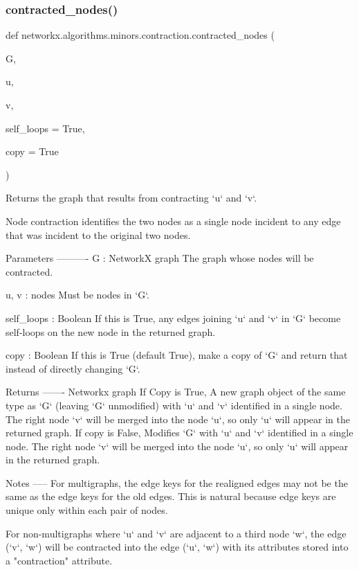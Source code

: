 \subsubsection{\texorpdfstring{contracted\+\_\+nodes()}{contracted\_nodes()}}
{\footnotesize\ttfamily def networkx.\+algorithms.\+minors.\+contraction.\+contracted\+\_\+nodes (\begin{DoxyParamCaption}\item[{}]{G,  }\item[{}]{u,  }\item[{}]{v,  }\item[{}]{self\+\_\+loops = {\ttfamily True},  }\item[{}]{copy = {\ttfamily True} }\end{DoxyParamCaption})}

\begin{DoxyVerb}Returns the graph that results from contracting `u` and `v`.

Node contraction identifies the two nodes as a single node incident to any
edge that was incident to the original two nodes.

Parameters
----------
G : NetworkX graph
    The graph whose nodes will be contracted.

u, v : nodes
    Must be nodes in `G`.

self_loops : Boolean
    If this is True, any edges joining `u` and `v` in `G` become
    self-loops on the new node in the returned graph.

copy : Boolean
    If this is True (default True), make a copy of
    `G` and return that instead of directly changing `G`.


Returns
-------
Networkx graph
    If Copy is True,
    A new graph object of the same type as `G` (leaving `G` unmodified)
    with `u` and `v` identified in a single node. The right node `v`
    will be merged into the node `u`, so only `u` will appear in the
    returned graph.
    If copy is False,
    Modifies `G` with `u` and `v` identified in a single node.
    The right node `v` will be merged into the node `u`, so
    only `u` will appear in the returned graph.

Notes
-----
For multigraphs, the edge keys for the realigned edges may
not be the same as the edge keys for the old edges. This is
natural because edge keys are unique only within each pair of nodes.

For non-multigraphs where `u` and `v` are adjacent to a third node
`w`, the edge (`v`, `w`) will be contracted into the edge (`u`,
`w`) with its attributes stored into a "contraction" attribute.


\end{DoxyVerb}
